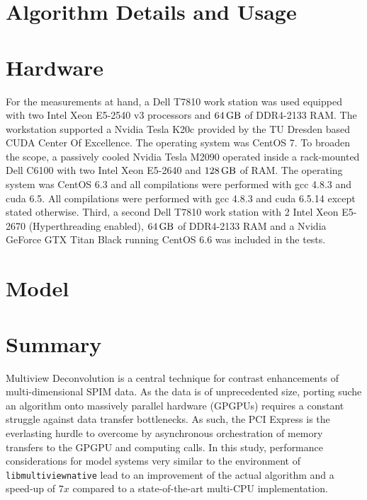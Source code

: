 \documentclass [a4paper,12pt]{article}
\def \lmvn {\texttt{libmultiviewnative}}
\def \gpu {GPGPU}
\def \cpu {CPU}
\begin{document}
\section{Algorithm Details and Usage}
\label{sec:alg}


\clearpage
\section{Hardware}
\label{sec:hw}

For the measurements at hand, a Dell T7810 work station was used equipped with two Intel Xeon E5-2540 v3 processors and $\unit[64]{GB}$ of DDR4-2133 RAM. The workstation supported a Nvidia Tesla K20c provided by the TU Dresden based CUDA Center Of Excellence. The operating system was CentOS 7. To broaden the scope, a passively cooled Nvidia Tesla M2090 operated inside a rack-mounted Dell C6100 with two Intel Xeon E5-2640 and $\unit[128]{GB}$ of RAM. The operating system was CentOS 6.3 and all compilations were performed with gcc 4.8.3 and cuda 6.5. All compilations were performed with gcc 4.8.3 and cuda 6.5.14 except stated otherwise. Third, a second Dell T7810 work station with 2 Intel Xeon E5-2670 (Hyperthreading enabled), $\unit[64]{GB}$ of DDR4-2133 RAM and a Nvidia GeForce GTX Titan Black running CentOS 6.6 was included in the tests.

\section{Model}
\label{sec:models}



\clearpage

\section{Summary}
\label{sec:summ}

Multiview Deconvolution is a central technique for contrast enhancements of multi-dimensional SPIM data. As the data is of unprecedented size, porting suche an algorithm onto massively parallel hardware (\gpu{}s) requires a constant struggle against data transfer bottlenecks. As such, the PCI Express is the everlasting hurdle to overcome by asynchronous orchestration of memory transfers to the \gpu{} and computing calls. In this study, performance considerations for model systems very similar to the environment of \lmvn{} lead to an improvement of the actual algorithm and a speed-up of $7x$ compared to a state-of-the-art multi-\cpu{} implementation.\newline
\end{document}
